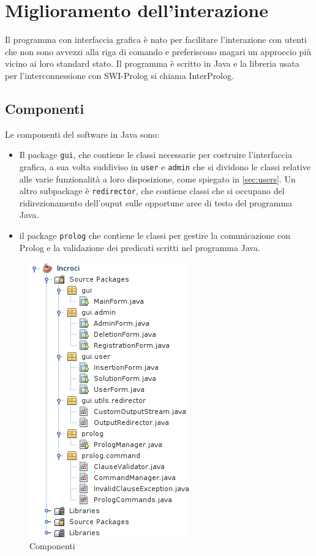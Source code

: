 \section{Miglioramento dell'interazione}
Il programma con interfaccia grafica è nato per facilitare l'interazione con utenti che non sono avvezzi alla riga di comando e preferiscono magari un approccio più vicino ai loro standard stato. Il programma è scritto in Java e la libreria usata per l'interconnessione con SWI-Prolog si chiama InterProlog.

\subsection{Componenti}
Le componenti del software in Java sono:

\begin{itemize}
	\item Il package \texttt{gui}, che contiene le classi necessarie per costruire l'interfaccia grafica, a sua volta suddiviso in \texttt{user} e \texttt{admin} che si dividono le classi relative alle varie funzionalità a loro disposizione, come spiegato in \ref{sec:users}. Un altro subpackage è \texttt{redirector}, che contiene classi che si occupano del ridirezionamento dell'ouput sulle opportune aree di testo del programma Java.
	\item il package \texttt{prolog} che contiene le classi per gestire la comunicazione con Prolog e la validazione dei predicati scritti nel programma Java.
\end{itemize}

\begin{figure}[!htbp]
	\centering
	\includegraphics[width=.4\textwidth]{images/java}
	\caption{Componenti}
\end{figure}

